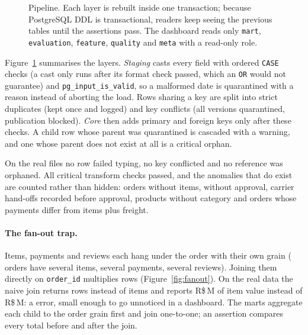 \documentclass[10pt,twocolumn]{article}
\newcommand{\code}[1]{\texttt{\small #1}}
\begin{document}
\begin{figure}[t]
\caption{Pipeline. Each layer is rebuilt inside one transaction; because PostgreSQL DDL is
transactional, readers keep seeing the previous tables until the assertions pass. The dashboard reads
only \code{mart}, \code{evaluation}, \code{feature}, \code{quality} and \code{meta} with a read-only role.}
\label{fig:pipeline}
\end{figure}

Figure~\ref{fig:pipeline} summarises the layers. \emph{Staging} casts every field with ordered
\code{CASE} checks (a cast only runs after its format check passed, which an \code{OR} would not
guarantee) and \code{pg\_input\_is\_valid}, so a malformed date is quarantined with a reason instead of
aborting the load. Rows sharing a key are split into strict duplicates (kept once and logged) and key
conflicts (all versions quarantined, publication blocked). \emph{Core} then adds primary and foreign
keys only after these checks. A child row whose parent was quarantined is cascaded with a warning, and
one whose parent does not exist at all is a critical orphan.

On the real files no row failed typing, no key conflicted and no reference was orphaned. All
\NCritTransform{} critical transform checks passed, and the anomalies that do exist are counted rather
than hidden: \WarnNoItems{} orders without items, \WarnNoApproval{} without approval, \WarnCarrier{}
carrier hand-offs recorded before approval, \WarnNoCategory{} products without category and \WarnGap{}
orders whose payments differ from items plus freight.

\paragraph{The fan-out trap.} Items, payments and reviews each hang under the order with their own
grain (\NMultiItem{} orders have several items, \NMultiPayment{} several payments, \NMultiReview{}
several reviews). Joining them directly on \code{order\_id} multiplies rows (Figure~\ref{fig:fanout}).
On the real data the naive join returns \NaiveRows{} rows instead of \NItems{} items and reports
R\$\NaiveItemValue{}\,M of item value instead of R\$\TrueItemValue{}\,M: a \FanoutPct{} error,
small enough to go unnoticed in a dashboard. The marts aggregate each child to the order grain first
and join one-to-one; an assertion compares every total before and after the join.
\end{document}
